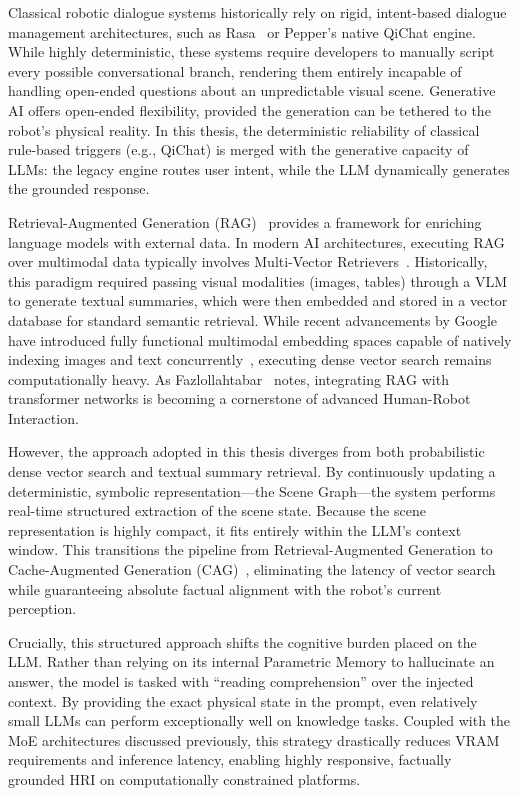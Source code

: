 Classical robotic dialogue systems historically rely on rigid, intent-based dialogue management architectures, such as Rasa~\cite{bocklisch_rasa_2017} or Pepper's native QiChat engine. While highly deterministic, these systems require developers to manually script every possible conversational branch, rendering them entirely incapable of handling open-ended questions about an unpredictable visual scene. Generative AI offers open-ended flexibility, provided the generation can be tethered to the robot's physical reality. In this thesis, the deterministic reliability of classical rule-based triggers (e.g., QiChat) is merged with the generative capacity of LLMs: the legacy engine routes user intent, while the LLM dynamically generates the grounded response.

Retrieval-Augmented Generation (RAG)~\cite{lewis_retrieval-augmented_2020} provides a framework for enriching language models with external data. In modern AI architectures, executing RAG over multimodal data typically involves Multi-Vector Retrievers~\cite{noauthor_multi-vector_nodate}. Historically, this paradigm required passing visual modalities (images, tables) through a VLM to generate textual summaries, which were then embedded and stored in a vector database for standard semantic retrieval. While recent advancements by Google have introduced fully functional multimodal embedding spaces capable of natively indexing images and text concurrently~\cite{noauthor_multi-vector_nodate}, executing dense vector search remains computationally heavy. As Fazlollahtabar~\cite{fazlollahtabar_human-robot_2025} notes, integrating RAG with transformer networks is becoming a cornerstone of advanced Human-Robot Interaction.

However, the approach adopted in this thesis diverges from both probabilistic dense vector search and textual summary retrieval. By continuously updating a deterministic, symbolic representation---the Scene Graph---the system performs real-time structured extraction of the scene state. Because the scene representation is highly compact, it fits entirely within the LLM's context window. This transitions the pipeline from Retrieval-Augmented Generation to Cache-Augmented Generation (CAG)~\cite{Chan_2025}, eliminating the latency of vector search while guaranteeing absolute factual alignment with the robot's current perception.

Crucially, this structured approach shifts the cognitive burden placed on the LLM. Rather than relying on its internal Parametric Memory to hallucinate an answer, the model is tasked with ``reading comprehension'' over the injected context. By providing the exact physical state in the prompt, even relatively small LLMs can perform exceptionally well on knowledge tasks. Coupled with the MoE architectures discussed previously, this strategy drastically reduces VRAM requirements and inference latency, enabling highly responsive, factually grounded HRI on computationally constrained platforms.



